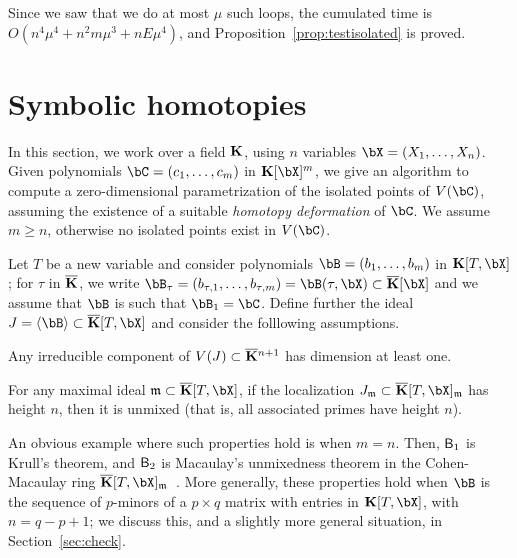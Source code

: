 \documentclass[12pt]{article}
\begin{document}
Since we saw that we do at most $\mu$ such loops, the cumulated time
is $O(n^4 \mu^4 + n^2 m \mu^3 + n E \mu^4)$, and
Proposition~\ref{prop:testisolated} is proved.



\section{Symbolic homotopies}\label{sec:homotopy}

In this section, we work over a field $\mathbf{K}$, using $n$ variables
$\bX=(X_1,\dots,X_n)$. Given polynomials $\bC=(c_1,\dots,c_m)$ in
$\KK[\bX]^m$, we give an algorithm to compute a zero-dimensional
parametrization of the isolated points of $V(\bC)$, assuming the
existence of a suitable {\em homotopy deformation} of $\bC$. We assume
$m\ge n$, otherwise no isolated points exist in $V(\bC)$.

Let $T$ be a new variable and consider polynomials
$\bB=(b_1,\dots,b_m)$ in $\KK[T,\bX]$; for $\tau$ in $\overline{\mathbf{K}}$,
we write $\bB_\tau=(b_{\tau,1},\dots,b_{\tau,m})=\bB(\tau,\bX)\subset
\KKbar[\bX]$ and we assume that $\bB$ is such that $\bB_1=\bC$.
Define further the ideal $J=\langle \bB \rangle \subset \KKbar[T,\bX]$ and
consider the folllowing assumptions.
\begin{description}[leftmargin=*]
\item[$\assA_1.$] Any irreducible component of $V(J) \subset
  \overline{\mathbf{K}}{}^{n+1}$ has dimension at least one.
\item[$\assA_2.$] For any maximal ideal $\m \subset\KKbar[T,\bX]$, if the
  localization $J_\m \subset \KKbar[T,\bX]_\m$ has height $n$, then it is
  unmixed (that is, all associated primes have height $n$).
\end{description}
An obvious example where such properties hold is when $m=n$. Then,
$\mathsf{B}_1$ is Krull's theorem, and $\mathsf{B}_2$ is Macaulay's unmixedness
theorem in the Cohen-Macaulay ring
$\KKbar[T,\bX]_\m$~\cite[Corollary~18.14]{Eisenbud95}. More generally,
these properties hold when $\bB$ is the sequence of $p$-minors of a $p
\times q$ matrix with entries in $\KK[T,\bX]$, with $n=q-p+1$; we
discuss this, and a slightly more general situation, in Section~\ref{sec:check}.  
\end{document}
